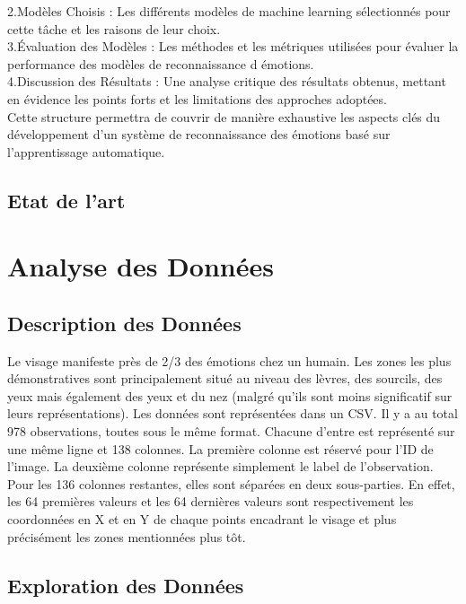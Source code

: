 \documentclass{rapport}
\begin{document}
2.Modèles Choisis : 
Les différents modèles de machine learning sélectionnés pour cette tâche et les raisons de leur choix.\\

3.Évaluation des Modèles :
Les méthodes et les métriques utilisées pour évaluer la performance des modèles de reconnaissance d émotions.\\

4.Discussion des Résultats : 
Une analyse critique des résultats obtenus, 
mettant en évidence les points forts et les limitations des approches adoptées.\\

Cette structure permettra de couvrir de manière exhaustive les aspects clés du développement 
d'un système de reconnaissance des émotions basé sur l'apprentissage automatique.

\subsection{Etat de l'art}

\section{Analyse des Données}
\subsection{Description des Données}

Le visage manifeste près de 2/3 des émotions chez un humain. \cite{koBriefReviewFacial2018} 
Les zones les plus démonstratives sont 
principalement situé au niveau des lèvres, des sourcils, des yeux mais 
également des yeux et du nez (malgré qu'ils sont moins significatif sur leurs
représentations). \cite{koBriefReviewFacial2018} Les données sont représentées dans 
un CSV. Il y a au total 978 observations, toutes sous le même format. Chacune 
d'entre est représenté sur une même ligne et 138 colonnes. La première colonne 
est réservé pour l'ID de l'image. La deuxième colonne représente simplement le 
label de l'observation. Pour les 136 colonnes restantes, elles sont séparées 
en deux sous-parties. En effet, les 64 premières valeurs et les 64 dernières 
valeurs sont respectivement les coordonnées en X et en Y de chaque points 
encadrant le visage et plus précisément les zones mentionnées plus tôt.

\subsection{Exploration des Données}
\end{document}
